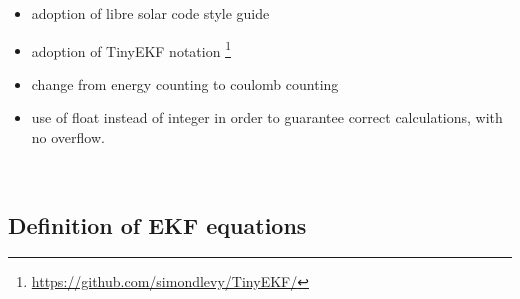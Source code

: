 \begin{itemize}
\item adoption of libre solar code style guide 

\item adoption of TinyEKF notation  \footnote{\url{https://github.com/simondlevy/TinyEKF/}} 
\item change from energy counting to coulomb counting

\item use of float instead of integer in order to guarantee correct calculations, with no overflow. 

\end{itemize}


\
\
\


\subsection{Definition of EKF equations}
\label{System's dynamic model}


%

